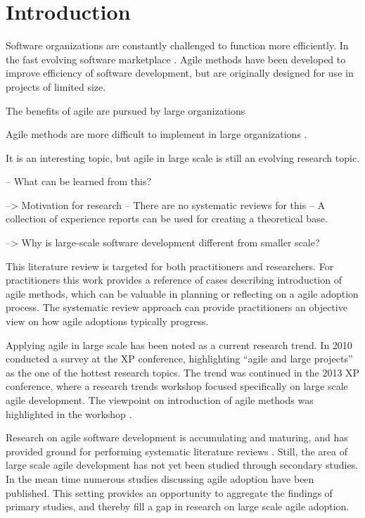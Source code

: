 
\chapter{Introduction}

Software organizations are constantly challenged to function more efficiently.
In the fast evolving software marketplace  . Agile methods have
been developed to improve efficiency of software development, but are originally
designed for use in projects of limited size.

The benefits of agile are pursued by large organizations

Agile methods are more difficult to implement in large organizations \citep{Dyba2008}.

It is an interesting topic, but agile in large scale is still an evolving
research topic.

-- What can be learned from this?

--> Motivation for research
-- There are no systematic reviews for this
-- A collection of experience reports can be used for creating a theoretical
   base.

--> Why is large-scale software development different from smaller scale?


This literature review is targeted for both practitioners and researchers. For
practitioners this work provides a reference of cases describing introduction
of agile methods, which can be valuable in planning or reflecting on a agile
adoption process. The systematic review approach can provide practitioners an
objective view on how agile adoptions typically progress.

Applying agile in large scale has been noted as a current research trend. In
2010 \citet{Freudenberg2010} conducted a survey at the XP conference,
highlighting ``agile and large projects'' as the one of the hottest research
topics. The trend was continued in the 2013 XP conference, where a research
trends workshop focused specifically on large scale agile development. The
viewpoint on introduction of agile methods was highlighted in the workshop
\citep{Dingsoyr2013a}.

Research on agile software development is accumulating and maturing, and has
provided ground for performing systematic literature reviews
\citep{Dyba2008,Jalali2012,Senapathi2013,Kaisti2013}. Still, the area of large
scale agile development has not yet been studied through secondary studies. In
the mean time numerous studies discussing agile adoption have been published.
This setting provides an opportunity to aggregate the findings of primary
studies, and thereby fill a gap in research on large scale agile adoption.

